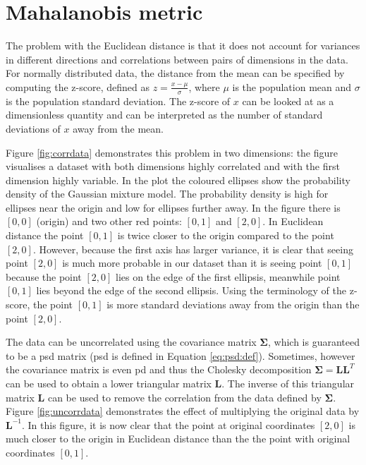 \documentclass[12pt,a4paper]{report}
\begin{document}

\section{Mahalanobis metric} \label{chap:intro:mah}

The problem with the Euclidean distance is that it does not account for variances in different directions and correlations between pairs of dimensions in the data. For normally distributed data, the distance from the mean can be specified by computing the z-score, defined as $z = \frac{x-\mu}{\sigma}$, where $\mu$ is the population mean and $\sigma$ is the population standard deviation. The z-score of $x$ can be looked at as a dimensionless quantity and can be interpreted as the number of standard deviations of $x$ away from the mean.

Figure \ref{fig:corrdata} demonstrates this problem in two dimensions: the figure visualises a dataset with both dimensions highly correlated and with the first dimension highly variable. In the plot the coloured ellipses show the probability density of the Gaussian mixture model. The probability density is high for ellipses near the origin and low for ellipses further away. In the figure there is $[0,0]$ (origin) and two other red points: $[0,1]$ and $[2,0]$. In Euclidean distance the point $[0,1]$ is twice closer to the origin compared to the point $[2,0]$. However, because the first axis has larger variance, it is clear that seeing point $[2,0]$ is much more probable in our dataset than it is seeing point $[0,1]$ because the point $[2,0]$ lies on the edge of the first ellipsis, meanwhile point $[0,1]$ lies beyond the edge of the second ellipsis. Using the terminology of the z-score, the point $[0,1]$ is more standard deviations away from the origin than the point $[2,0]$.


The data can be uncorrelated using the covariance matrix $\bm{\Sigma}$, which is guaranteed to be a \ac{psd} matrix (\ac{psd} is defined in Equation \ref{eq:psd:def}). Sometimes, however the covariance matrix is even \ac{pd} and thus the Cholesky decomposition $\bm{\Sigma}=\bm{L}\bm{L}^T$ can be used to obtain a lower triangular matrix $\bm{L}$. The inverse of this triangular matrix $\bm{L}$ can be used to remove the correlation from the data defined by $\bm{\Sigma}$. Figure \ref{fig:uncorrdata} demonstrates the effect of multiplying the original data by $\bm{L}^{-1}$. In this figure, it is now clear that the point at original coordinates $[2,0]$ is much closer to the origin in Euclidean distance than the the point with original coordinates $[0,1]$.
\end{document}

